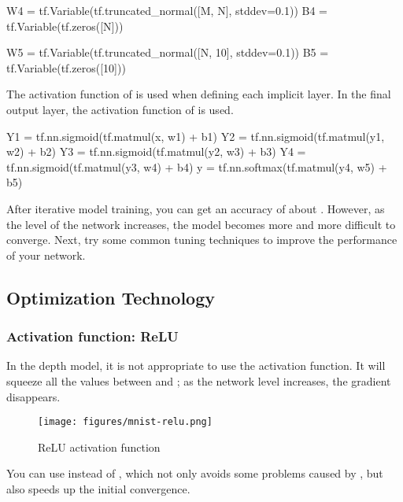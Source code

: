 \begin{content}
\begin{content}
\begin{leftbar}
\begin{python}
W4 = tf.Variable(tf.truncated_normal([M, N], stddev=0.1)) 
B4 = tf.Variable(tf.zeros([N]))

W5 = tf.Variable(tf.truncated_normal([N, 10], stddev=0.1)) 
B5 = tf.Variable(tf.zeros([10]))
\end{python}
\end{leftbar}

The activation function of  is used when defining each implicit layer. In the final output layer, the activation function of  is used.

\begin{leftbar}
\begin{python}
Y1 = tf.nn.sigmoid(tf.matmul(x, w1) + b1)
Y2 = tf.nn.sigmoid(tf.matmul(y1, w2) + b2)
Y3 = tf.nn.sigmoid(tf.matmul(y2, w3) + b3)
Y4 = tf.nn.sigmoid(tf.matmul(y3, w4) + b4)
y = tf.nn.softmax(tf.matmul(y4, w5) + b5)
\end{python}
\end{leftbar}

After iterative model training, you can get an accuracy of about . However, as the level of the network increases, the model becomes more and more difficult to converge. Next, try some common tuning techniques to improve the performance of your network.

\subsection{Optimization Technology}

\subsubsection{Activation function: ReLU}

In the depth model, it is not appropriate to use the  activation function. It will squeeze all the values ​​between  and ; as the network level increases, the gradient disappears.

\begin{figure}[H]
\centering
\texttt{[image: figures/mnist-relu.png]}
\caption{ReLU activation function}
 \label{fig:mnist-relu}
\end{figure}

You can use  instead of , which not only avoids some problems caused by , but also speeds up the initial convergence.


\end{content}
\end{content}
